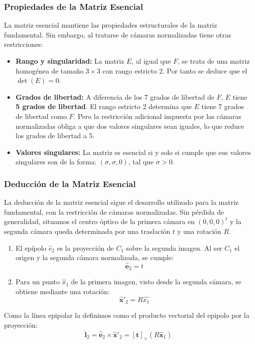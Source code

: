\documentclass[
10pt, %
a4paper, %
oneside, %
headinclude,footinclude, %
BCOR=5mm, %
]{scrartcl}
\begin{document}
\subsubsection{Propiedades de la Matriz Esencial}
La matriz esencial mantiene las propiedades estructurales de la matriz fundamental. Sin embargo, al tratarse de cámaras normalizadas tiene otras restricciones: 
\begin{itemize}
    \item \textbf{Rango y singularidad:} La matriz $E$, al igual que $F$, se trata de una matriz homogénea de tamaño $3 \times 3$ con rango estricto 2. Por tanto se deduce que el $\det(E) = 0$.
    \item \textbf{Grados de libertad:} A diferencia de los 7 grados de libertad de $F$, $E$ tiene \textbf{5 grados de libertad}. El rango estricto 2 determina que $E$ tiene 7 grados de libertad como $F$. Pero la restricción adicional impuesta por las cámaras normalizadas obliga a que dos valores singulares sean iguales, lo que reduce los grados de libertad a 5.
    \item \textbf{Valores singulares:} La matriz es esencial si y solo si cumple que sus valores singulares son de la forma: $(\sigma,\sigma,0)$, tal que $\sigma>0$. 
\end{itemize}

\subsubsection{Deducción de la Matriz Esencial}
La deducción de la matriz esencial sigue el desarrollo utilizado para la matriz fundamental, con la restricción de cámaras normalizadas. Sin pérdida de generalidad, situamos el centro óptico de la primera cámara en $(0,0,0)^t$ y la segunda cámara queda determinada por una traslación $t$ y una rotación $R$. 

\begin{enumerate}
    \item El epípolo $\hat{e}_2$ es la proyección de $C_1$ sobre la segunda imagen. Al ser $C_1$ el origen y la segunda cámara normalizada, se cumple:
    \[
        \mathbf{\hat{e}}_2 = t
    \]
    \item Para un punto $\hat{x}_1$ de la primera imagen, visto desde la segunda cámara, se obtiene mediante una rotación:
    \[
        \mathbf{\hat{x}}'_2 = R\hat{x_1}
    \]
\end{enumerate}

Como la línea epipolar la definimos como el producto vectorial del epipolo por la proyección: 
\begin{equation}
    \mathbf{\hat{l}}_2 = \mathbf{\hat{e}}_2 \times \mathbf{\hat{x}}'_2 = [\mathbf{t}]_\times \left( R \mathbf{\hat{x}}_1 \right)
\end{equation}
\end{document}
